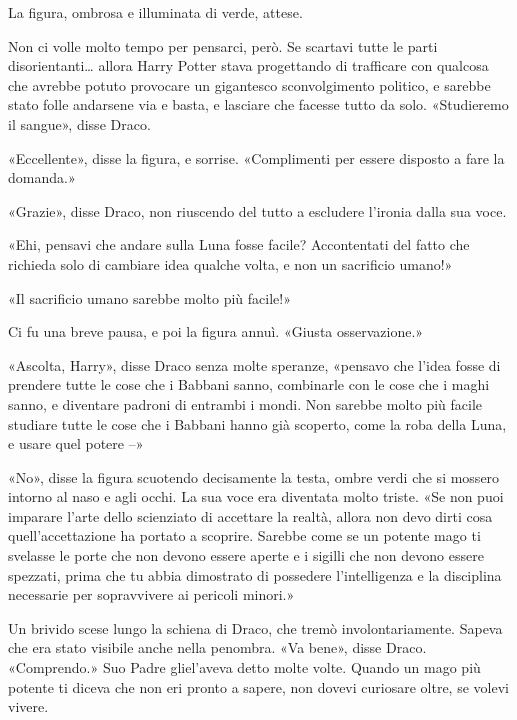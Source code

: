 La figura, ombrosa e illuminata di verde, attese.

Non ci volle molto tempo per pensarci, però. Se scartavi tutte le parti disorientanti… allora Harry Potter stava progettando di trafficare con qualcosa che avrebbe potuto provocare un gigantesco sconvolgimento politico, e sarebbe stato folle andarsene via e basta, e lasciare che facesse tutto da solo. «Studieremo il sangue», disse Draco.

«Eccellente», disse la figura, e sorrise. «Complimenti per essere disposto a fare la domanda.»

«Grazie», disse Draco, non riuscendo del tutto a escludere l’ironia dalla sua voce.

«Ehi, pensavi che andare sulla Luna fosse facile? Accontentati del fatto che richieda solo di cambiare idea qualche volta, e non un sacrificio umano!»

«Il sacrificio umano sarebbe molto più facile!»

Ci fu una breve pausa, e poi la figura annuì. «Giusta osservazione.»

«Ascolta, Harry», disse Draco senza molte speranze, «pensavo che l’idea fosse di prendere tutte le cose che i Babbani sanno, combinarle con le cose che i maghi sanno, e diventare padroni di entrambi i mondi. Non sarebbe molto più facile studiare tutte le cose che i Babbani hanno già scoperto, come la roba della Luna, e usare quel potere –»

«No», disse la figura scuotendo decisamente la testa, ombre verdi che si mossero intorno al naso e agli occhi. La sua voce era diventata molto triste. «Se non puoi imparare l’arte dello scienziato di accettare la realtà, allora non devo dirti cosa quell’accettazione ha portato a scoprire. Sarebbe come se un potente mago ti svelasse le porte che non devono essere aperte e i sigilli che non devono essere spezzati, prima che tu abbia dimostrato di possedere l’intelligenza e la disciplina necessarie per sopravvivere ai pericoli minori.»

Un brivido scese lungo la schiena di Draco, che tremò involontariamente. Sapeva che era stato visibile anche nella penombra. «Va bene», disse Draco. «Comprendo.» Suo Padre gliel’aveva detto molte volte. Quando un mago più potente ti diceva che non eri pronto a sapere, non dovevi curiosare oltre, se volevi vivere.

